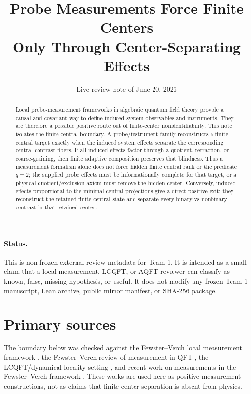\documentclass[12pt]{article}
\title{Probe Measurements Force Finite Centers\\
Only Through Center-Separating Effects}
\author{}
\date{Live review note of June 20, 2026}
\theoremstyle{remark}
\begin{document}
\maketitle

\begin{abstract}
Local probe-measurement frameworks in algebraic quantum field theory provide a
causal and covariant way to define induced system observables and instruments.
They are therefore a possible positive route out of finite-center
nonidentifiability.  This note isolates the finite-central boundary.  A
probe/instrument family reconstructs a finite central target exactly when the
induced system effects separate the corresponding central contrast fibers.
If all induced effects factor through a quotient, retraction, or
coarse-graining, then finite adaptive composition preserves that blindness.
Thus a measurement formalism alone does not force hidden finite central rank or
the predicate \(q=2\); the supplied probe effects must be informationally
complete for that target, or a physical quotient/exclusion axiom must remove
the hidden center.  Conversely, induced effects proportional to the minimal
central projections give a direct positive exit: they reconstruct the retained
finite central state and separate every binary-vs-nonbinary contrast in that
retained center.
\end{abstract}

\paragraph{Status.}
This is non-frozen external-review metadata for Team 1.  It is intended as a
small claim that a local-measurement, LCQFT, or AQFT reviewer can classify as
known, false, missing-hypothesis, or useful.  It does not modify any frozen
Team 1 manuscript, Lean archive, public mirror manifest, or SHA-256 package.

\section{Primary sources}

The boundary below was checked against the Fewster--Verch local measurement
framework \cite{FewsterVerchMeasurements}, the Fewster--Verch review of
measurement in QFT \cite{FewsterVerchReview}, the LCQFT/dynamical-locality
setting \cite{FewsterVerchDynamical}, and recent work on measurements in the
Fewster--Verch framework \cite{MandryschNavascues}.  These works are used here
as positive measurement constructions, not as claims that finite-center
separation is absent from physics.
\end{document}
